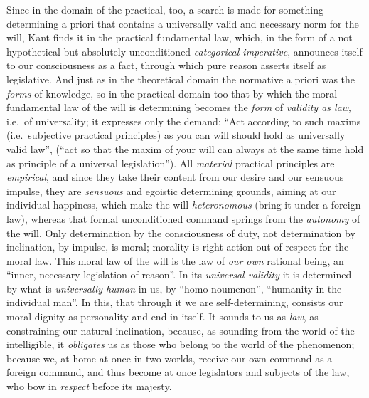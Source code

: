 Since in the domain of the practical, too, a search is made for
something determining a priori that contains a universally valid and
necessary norm for the will, Kant finds it in the practical fundamental
law, which, in the form of a not hypothetical but absolutely
unconditioned \emph{categorical imperative}, announces itself to our
consciousness as a fact, through which pure reason asserts itself as
legislative. And just as in the theoretical domain the normative a
priori was the \emph{forms} of knowledge, so in the practical domain too
that by which the moral fundamental law of the will is determining
becomes the \emph{form} of \emph{validity as law}, i.e.\ of
universality; it expresses only the demand: ``Act according to such
maxims (i.e.\ subjective practical principles) as you can will should
hold as universally valid law'', (``act so that the maxim of your will
can always at the same time hold as principle of a universal
legislation''). All \emph{material} practical principles are
\emph{empirical}, and since they take their content from our desire and
our sensuous impulse, they are \emph{sensuous} and egoistic determining
grounds, aiming at our individual happiness, which make the will
\emph{heteronomous} (bring it under a foreign law), whereas that formal
unconditioned command springs from the \emph{autonomy} of the will. Only
determination by the consciousness of duty, not determination by
inclination, by impulse, is moral; morality is right action
out of respect for the moral law. This moral law of the will is the law
of \emph{our own} rational being, an ``inner, necessary legislation of
reason''. In its \emph{universal validity} it is determined by what is
\emph{universally human} in us, by ``homo noumenon'', ``humanity in the
individual man''. In this, that through it we are self-determining,
consists our moral dignity as personality and end in itself. It sounds
to us as \emph{law}, as constraining our natural inclination, because,
as sounding from the world of the intelligible, it \emph{obligates} us
as those who belong to the world of the phenomenon; because we, at home
at once in two worlds, receive our own command as a foreign command, and
thus become at once legislators and subjects of the law, who bow in
\emph{respect} before its majesty.

